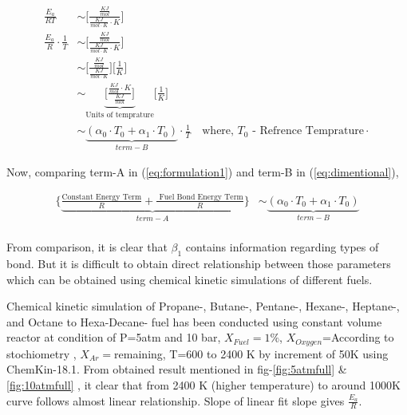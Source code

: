 \documentclass[preprint,12pt]{elsarticle}
\begin{document}
		\begin{equation}\label{eq:dimentional}
		\begin{aligned}		
		\frac{E_a}{RT} &\sim \bigg[ \frac{\frac{KJ}{mol}}{\frac{KJ}{mol \cdot K } \cdot K }\bigg ]\\ 
		\frac{E_a}{R} \cdot \frac{1}{T} &\sim \bigg[ \frac{\frac{KJ}{mol}}{\frac{KJ}{mol \cdot K } \cdot K }\bigg ] \\
		&\sim \bigg[ \frac{\frac{KJ}{mol}}{\frac{KJ} {mol \cdot K }} \bigg ]  \bigg[\frac{1}{K}\bigg ] \\
		&\sim \underbrace{\bigg[ \frac{\frac{KJ}{mol} \cdot K }{\frac{KJ} {mol  }} \bigg ]}_{\text{Units of temprature}} \bigg[\frac{1}{K}\bigg ] \\
		&\sim \underbrace{(\alpha_0 \cdot T_0 + \alpha_1 \cdot T_0 )}_{term-B} \cdot \frac{1}{T} \:\:\:  \text{ where, $T_0$ - Refrence Temprature} \cdot  
		\end{aligned}
		\end{equation}	
		
		\newpage 
		
		Now, comparing term-A in (\ref{eq:formulation1}) and term-B in (\ref{eq:dimentional}),
	
		\begin{equation}\label{eq:formula__comparision_full}
		\begin{aligned}		
		\bigg\{\underbrace{\frac{\text{Constant Energy Term}}{R} + \frac{\text{ Fuel Bond Energy Term}}{R} }_{term-A}\bigg\} &\sim \underbrace{(\alpha_0 \cdot T_0 + \alpha_1 \cdot T_0 )}_{term-B}\\
		\end{aligned}
		\end{equation}
		
		 From comparison, it is clear that $\beta_1$ contains information regarding types of bond. But it is difficult to obtain direct relationship between those parameters which can be obtained using chemical kinetic simulations of different fuels. 
		
		Chemical kinetic simulation of Propane-\cite{propanemech}, Butane-\cite{butanemech}, Pentane-\cite{pentanemech}, Hexane-\cite{hexanemech}, Heptane-\cite{heptanemech}, and Octane to Hexa-Decane-\cite{c8toc16mech} fuel has been conducted using constant volume reactor at condition of P=5atm  and 10 bar, $X_{Fuel}=1\%$, $X_{Oxygen}$=According to  stochiometry , $X_{Ar}=$remaining, T=600 to 2400 K by increment of 50K using ChemKin-18.1. From obtained result mentioned in fig-\ref{fig:5atmfull} \& \ref{fig:10atmfull} , it clear that from 2400 K (higher temperature) to around 1000K curve follows almost linear relationship. Slope of linear fit slope gives $\frac{E_a}{R}$.
		
\end{document}
